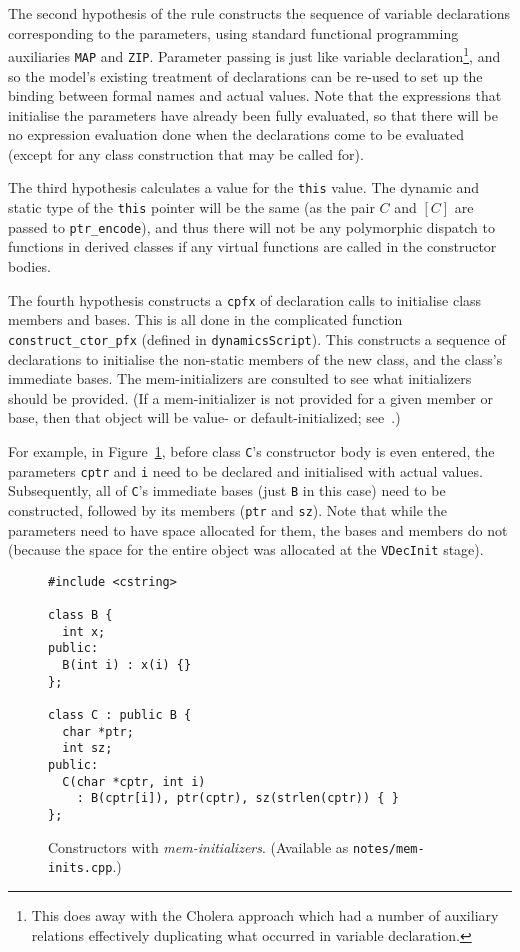 \documentclass[11pt]{article}
\begin{document}
The second hypothesis of the rule constructs the sequence of variable
declarations corresponding to the parameters, using standard
functional programming auxiliaries \texttt{MAP} and \texttt{ZIP}.
Parameter passing is just like variable declaration\footnote{This does
  away with the \textsf{Cholera} approach which had a number of
  auxiliary relations effectively duplicating what occurred in
  variable declaration.}, and so the model's existing treatment of
declarations can be re-used to set up the binding between formal names
and actual values.  Note that the expressions that initialise the
parameters have already been fully evaluated, so that there will be no
expression evaluation done when the declarations come to be evaluated
(except for any class construction that may be called for).

The third hypothesis calculates a value for the \texttt{this} value.
The dynamic and static type of the \texttt{this} pointer will be the
same (as the pair $C$ and $[C]$ are passed to \texttt{ptr_encode}),
and thus there will not be any polymorphic dispatch to functions in
derived classes if any virtual functions are called in the constructor
bodies.

The fourth hypothesis constructs a \texttt{cpfx} of declaration calls
to initialise class members and bases.  This is all done in the
complicated function \texttt{construct_ctor_pfx} (defined in
\texttt{dynamicsScript}).  This constructs a sequence of declarations
to initialise the non-static members of the new class, and the class's
immediate bases.  The mem-initializers are consulted to see what
initializers should be provided.  (If a mem-initializer is not
provided for a given member or base, then that object will be value-
or default-initialized; see~\cite[\S12.6.2, paragraphs
3--4]{cpp-standard-iso14882}.)

For example, in Figure~\ref{fig:mem-inits}, before class \texttt{C}'s
constructor body is even entered, the parameters \texttt{cptr} and
\texttt{i} need to be declared and initialised with actual values.
Subsequently, all of \texttt{C}'s immediate bases (just \texttt{B} in
this case) need to be constructed, followed by its members
(\texttt{ptr} and \texttt{sz}).  Note that while the parameters need
to have space allocated for them, the bases and members do not
(because the space for the entire object was allocated at the
\texttt{VDecInit} stage).

\begin{figure}[htbp]
\begin{verbatim}
#include <cstring>

class B {
  int x;
public:
  B(int i) : x(i) {}
};

class C : public B {
  char *ptr;
  int sz;
public:
  C(char *cptr, int i)
    : B(cptr[i]), ptr(cptr), sz(strlen(cptr)) { }
};
\end{verbatim}
  \caption[\cpp{} Constructors with \emph{mem-initializers}]{\cpp{}
    Constructors with \emph{mem-initializers}.  (Available as
    \texttt{notes/mem-inits.cpp}.)}
\label{fig:mem-inits}
\end{figure}
\end{document}
